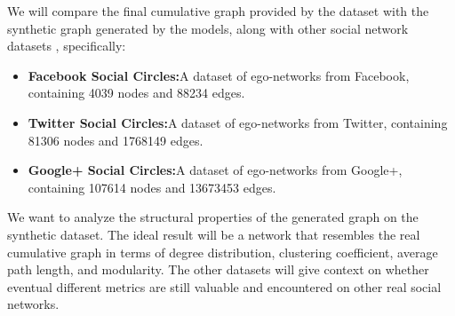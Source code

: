 We will compare the final cumulative graph provided by the dataset with the synthetic graph generated by the models, along with other social network datasets \cite{leskovec2012learning}, specifically:

\begin{itemize}
	\item \textbf{Facebook Social Circles:}\footnotemark[1] A dataset of ego-networks from Facebook, containing 4039 nodes and 88234 edges.

	\item \textbf{Twitter Social Circles:}\footnotemark[2] A dataset of ego-networks from Twitter, containing 81306 nodes and 1768149 edges.

	\item \textbf{Google+ Social Circles:}\footnotemark[3] A dataset of ego-networks from Google+, containing 107614 nodes and 13673453 edges.
\end{itemize}

We want to analyze the structural properties of the generated graph on the synthetic dataset. The ideal result will be a network that resembles the real cumulative graph in terms of degree distribution, clustering coefficient, average path length, and modularity. The other datasets will give context on whether eventual different metrics are still valuable and encountered on other real social networks.


